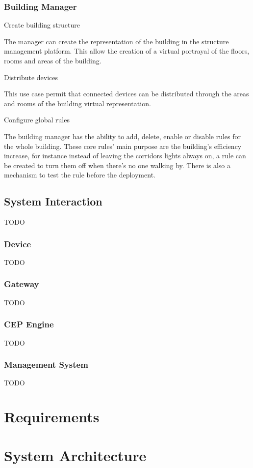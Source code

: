 \subsubsection{Building Manager}

\begin{Paragraph}{Create building structure}
	
The manager can create the representation of the building in the structure management platform. This allow the creation of a virtual portrayal of the floors, rooms and areas of the building.
	
\end{Paragraph}

\begin{Paragraph}{Distribute devices}

This use case permit that connected devices can be distributed through the areas and rooms of the building virtual representation.
	
\end{Paragraph}

\begin{Paragraph}{Configure global rules}

The building manager has the ability to add, delete, enable or disable rules for the whole building. These core rules' main purpose are the building's efficiency increase, for instance instead of leaving the corridors lights always on, a rule can be created to turn them off when there's no one walking by. There is also a mechanism to test the rule before the deployment.

\end{Paragraph}


\subsection{System Interaction}
\label{Use:system}
TODO
\subsubsection{Device}
TODO
\subsubsection{Gateway}
TODO
\subsubsection{CEP Engine}
TODO
\subsubsection{Management System}
TODO

\section{Requirements}
\label{Architecture:Requirements}

\section{System Architecture}
\label{Architecture:Architecture}



